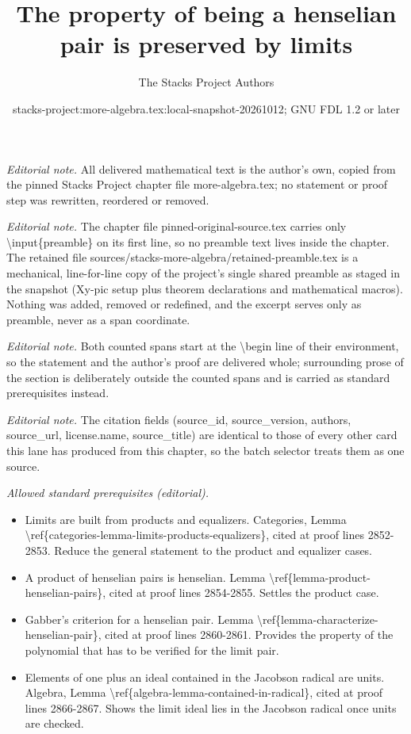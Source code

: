 \documentclass[10pt,a4paper]{amsart}
\title{The property of being a henselian pair is preserved by limits}
\author{The Stacks Project Authors}
\date{stacks-project:more-algebra.tex:local-snapshot-20261012; GNU FDL 1.2 or later}
\theoremstyle{plain}
\theoremstyle{definition}
\theoremstyle{remark}
\numberwithin{equation}{subsection}
\begin{document}
\maketitle
\setcounter{subsection}{1}
\noindent\textit{Editorial note.} All delivered mathematical text is the author's own, copied from the pinned Stacks Project chapter file more-algebra.tex; no statement or proof step was rewritten, reordered or removed.\par\medskip
\noindent\textit{Editorial note.} The chapter file pinned-original-source.tex carries only \textbackslash{}input\{preamble\} on its first line, so no preamble text lives inside the chapter. The retained file sources/stacks-more-algebra/retained-preamble.tex is a mechanical, line-for-line copy of the project's single shared preamble as staged in the snapshot (Xy-pic setup plus theorem declarations and mathematical macros). Nothing was added, removed or redefined, and the excerpt serves only as preamble, never as a span coordinate.\par\medskip
\noindent\textit{Editorial note.} Both counted spans start at the \textbackslash{}begin line of their environment, so the statement and the author's proof are delivered whole; surrounding prose of the section is deliberately outside the counted spans and is carried as standard prerequisites instead.\par\medskip
\noindent\textit{Editorial note.} The citation fields (source\_id, source\_version, authors, source\_url, license.name, source\_title) are identical to those of every other card this lane has produced from this chapter, so the batch selector treats them as one source.\par\medskip
\noindent\textit{Allowed standard prerequisites (editorial).}\begin{itemize}
\item Limits are built from products and equalizers. Categories, Lemma \textbackslash{}ref\{categories-lemma-limits-products-equalizers\}, cited at proof lines 2852-2853. Reduce the general statement to the product and equalizer cases.
\item A product of henselian pairs is henselian. Lemma \textbackslash{}ref\{lemma-product-henselian-pairs\}, cited at proof lines 2854-2855. Settles the product case.
\item Gabber's criterion for a henselian pair. Lemma \textbackslash{}ref\{lemma-characterize-henselian-pair\}, cited at proof lines 2860-2861. Provides the property of the polynomial that has to be verified for the limit pair.
\item Elements of one plus an ideal contained in the Jacobson radical are units. Algebra, Lemma \textbackslash{}ref\{algebra-lemma-contained-in-radical\}, cited at proof lines 2866-2867. Shows the limit ideal lies in the Jacobson radical once units are checked.
\end{itemize}\medskip
\end{document}
